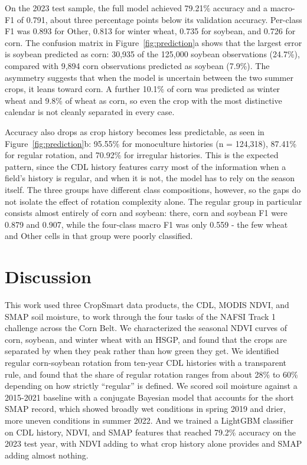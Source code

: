 \documentclass[10pt,letterpaper]{article}
\begin{document}
On the 2023 test sample, the full model achieved 79.21\% accuracy and a macro-F1 of 0.791, about three percentage points below its validation accuracy. Per-class F1 was 0.893 for Other, 0.813 for winter wheat, 0.735 for soybean, and 0.726 for corn. The confusion matrix in Figure~\ref{fig:prediction}a shows that the largest error is soybean predicted as corn: 30,935 of the 125,000 soybean observations (24.7\%), compared with 9,894 corn observations predicted as soybean (7.9\%). The asymmetry suggests that when the model is uncertain between the two summer crops, it leans toward corn. A further 10.1\% of corn was predicted as winter wheat and 9.8\% of wheat as corn, so even the crop with the most distinctive calendar is not cleanly separated in every case.

Accuracy also drops as crop history becomes less predictable, as seen in Figure~\ref{fig:prediction}b: 95.55\% for monoculture histories (n = 124,318), 87.41\% for regular rotation, and 70.92\% for irregular histories. This is the expected pattern, since the CDL history features carry most of the information when a field's history is regular, and when it is not, the model has to rely on the season itself. The three groups have different class compositions, however, so the gaps do not isolate the effect of rotation complexity alone. The regular group in particular consists almost entirely of corn and soybean: there, corn and soybean F1 were 0.879 and 0.907, while the four-class macro F1 was only 0.559 - the few wheat and Other cells in that group were poorly classified.

\FloatBarrier\section{Discussion}\label{sec:discussion}

This work used three CropSmart data products, the CDL, MODIS NDVI, and SMAP soil moisture, to work through the four tasks of the NAFSI Track 1 challenge across the Corn Belt. We characterized the seasonal NDVI curves of corn, soybean, and winter wheat with an HSGP, and found that the crops are separated by when they peak rather than how green they get. We identified regular corn-soybean rotation from ten-year CDL histories with a transparent rule, and found that the share of regular rotation ranges from about 28\% to 60\% depending on how strictly ``regular'' is defined. We scored soil moisture against a 2015-2021 baseline with a conjugate Bayesian model that accounts for the short SMAP record, which showed broadly wet conditions in spring 2019 and drier, more uneven conditions in summer 2022. And we trained a LightGBM classifier on CDL history, NDVI, and SMAP features that reached 79.2\% accuracy on the 2023 test year, with NDVI adding to what crop history alone provides and SMAP adding almost nothing.
\end{document}
